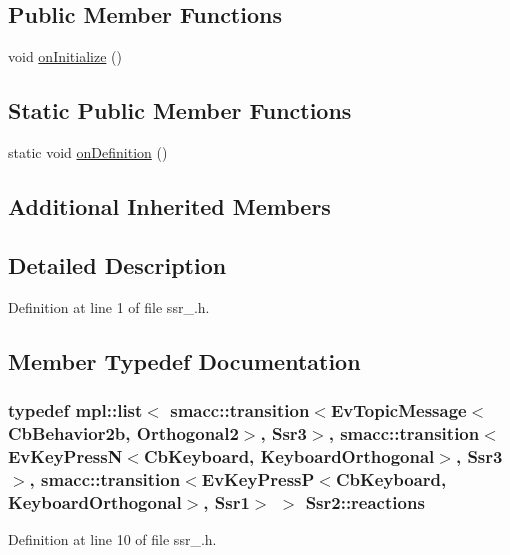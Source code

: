 \subsection*{Public Member Functions}
\begin{DoxyCompactItemize}
\item 
void \hyperlink{structSsr2_a2cf5995600fcc702887dde10aee84902}{on\+Initialize} ()
\end{DoxyCompactItemize}
\subsection*{Static Public Member Functions}
\begin{DoxyCompactItemize}
\item 
static void \hyperlink{structSsr2_ab5924184e178dac57b8f6737bb61cbc6}{on\+Definition} ()
\end{DoxyCompactItemize}
\subsection*{Additional Inherited Members}


\subsection{Detailed Description}


Definition at line 1 of file ssr\+\_.\+h.



\subsection{Member Typedef Documentation}
\subsubsection[{\texorpdfstring{reactions}{reactions}}]{\setlength{\rightskip}{0pt plus 5cm}typedef mpl\+::list$<$ {\bf smacc\+::transition}$<$Ev\+Topic\+Message$<$Cb\+Behavior2b, Orthogonal2$>$, {\bf Ssr3}$>$, {\bf smacc\+::transition}$<$Ev\+Key\+PressN$<$Cb\+Keyboard, Keyboard\+Orthogonal$>$, {\bf Ssr3}$>$, {\bf smacc\+::transition}$<$Ev\+Key\+PressP$<$Cb\+Keyboard, Keyboard\+Orthogonal$>$, {\bf Ssr1}$>$ $>$ {\bf Ssr2\+::reactions}}\hypertarget{structSsr2_ae5ede00900d85079cb8c764b3f0fa53e}{}\label{structSsr2_ae5ede00900d85079cb8c764b3f0fa53e}


Definition at line 10 of file ssr\+\_.\+h.



